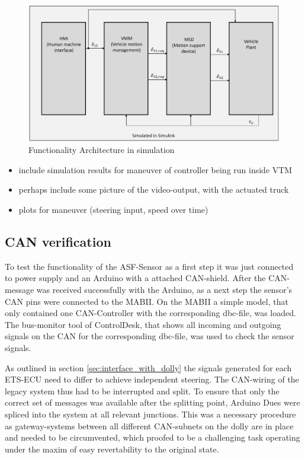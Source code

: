 \documentclass[ExampleMasters.tex]{subfiles}
\begin{document}
\begin{figure}[!htb]

	\centering
	\includegraphics[width=0.5\linewidth]{figures/functionality_architecture_sim}
	
	\caption{Functionality Architecture in simulation}
	\label{fig:funct_architecture_sim}
\end{figure}

\begin{itemize}
	\item include simulation results for maneuver of controller being run inside \gls{VTM} 
	\item perhaps include some picture of the video-output, with the actuated truck
	\item plots for maneuver (steering input, speed over time)
	
\end{itemize}
\subsection{CAN verification}
To test the functionality of the \gls{ASF}-Sensor as a first step it was just connected to power supply and an Arduino with a attached \gls{CAN}-shield. After the \gls{CAN}-message was received successfully with the Arduino, as a next step the sensor's \gls{CAN} pins were connected to the \gls{MABII}. On the \gls{MABII} a simple model, that only contained one \gls{CAN}-Controller with the corresponding dbc-file, was loaded. The bus-monitor tool of ControlDesk, that shows all incoming and outgoing signals on the \gls{CAN} for the corresponding dbc-file, was used to check the sensor signals. 

As outlined in section \ref{sec:interface_with_dolly} the signals generated for each \gls{ETS}-\gls{ECU} need to differ to achieve independent steering. The \gls{CAN}-wiring of the legacy system thus had to be interrupted and split. To ensure that only the correct set of messages was available after the splitting point, Arduino Dues were spliced into the system at all relevant junctions. This was a necessary procedure as gateway-systems between all different \gls{CAN}-subnets on the dolly are in place and needed to be circumvented, which proofed to be a challenging task operating under the maxim of easy revertability to the original state.
\end{document}
